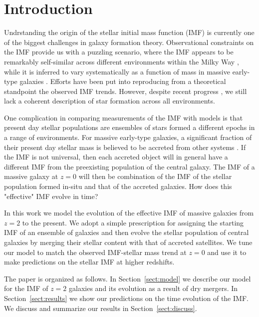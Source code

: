\documentclass[usenatbib, letters]{mnras}
\def\Sref#1{Section~\ref{#1}\xspace}
\begin{document}
\section{Introduction}\label{sect:intro}

Undrstanding the origin of the stellar initial mass function (IMF) is currently one of the biggest challenges in galaxy formation theory.
Observational constraints on the IMF provide us with a puzzling scenario, where the IMF appears to be remarkably self-similar across different environments within the Milky Way \citep[see e.g.][]{BCM10}, while it is inferred to vary systematically as a function of mass in massive early-type galaxies \citep{Tre++10,Cap++12,CvD12,Spi++14}.
Efforts have been put into reproducing from a theoretical standpoint the observed IMF trends. However, despite recent progress \citep{H+C11,Kru11,Hop12,GKH15}, we still lack a coherent description of star formation across all environments.

One complication in comparing measurements of the IMF with models is that present day stellar populations are ensembles of stars formed a different epochs in a range of environments.
For massive early-type galaxies, a significant fraction of their present day stellar mass is believed to be accreted from other systems \citep{vDo++10}.
If the IMF is not universal, then each accreted object will in general have a different IMF from the preexisting population of the central galaxy.
The IMF of a massive galaxy at $z=0$ will then be combination of the IMF of the stellar population formed in-situ and that of the accreted galaxies.
How does this "effective" IMF evolve in time?

In this work we model the evolution of the effective IMF of massive galaxies from $z=2$ to the present.
We adopt a simple prescription for assigning the starting IMF of an ensemble of galaxies and then evolve the stellar population of central galaxies by merging their stellar content with that of accreted satellites.
We tune our model to match the observed IMF-stellar mass trend at $z=0$ and use it to make predictions on the stellar IMF at higher redshifts.

The paper is organized as follows.  In \Sref{sect:model} we describe our model for the IMF of $z=2$ galaxies and its evolution as a result of dry mergers.
In \Sref{sect:results} we show our predictions on the time evolution of the IMF.
We discuss and summarize our results in \Sref{sect:discuss}.

\end{document}
